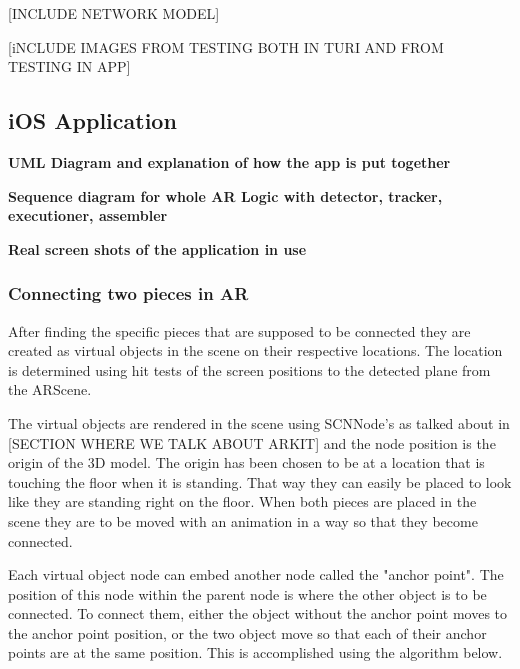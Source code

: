 [INCLUDE NETWORK MODEL]


[iNCLUDE IMAGES FROM TESTING BOTH IN TURI AND FROM TESTING IN APP] 

\subsection{iOS Application}

\textbf{UML Diagram and explanation of how the app is put together}

\textbf{Sequence diagram for whole AR Logic with detector, tracker, executioner, assembler}

\textbf{Real screen shots of the application in use}



\subsubsection{Connecting two pieces in AR}
After finding the specific pieces that are supposed to be connected they are created as
virtual objects in the scene on their respective locations. The location is determined using
hit tests of the screen positions to the detected plane from the ARScene.

The virtual objects are rendered in the scene using SCNNode's as talked about in [SECTION WHERE WE TALK ABOUT ARKIT] and the node position is the origin of the 3D model. The origin has been chosen to be at a location that is touching the floor when it is standing. That way they can easily be placed to look like they are standing right on the floor.
When both pieces are placed in the scene they are to be moved with an animation in a way so that they become connected.

Each virtual object node can embed another node called the "anchor point". The position of this node within the parent node is where the other object is to be connected. To connect them, either the object without the anchor point moves to the anchor point position, or the two object move so that each of their anchor points are at the same position.
This is accomplished using the algorithm below.

